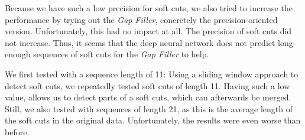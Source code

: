Because we have such a low precision for soft cuts, we also tried to increase the performance by trying out the \textit{Gap Filler}, concretely the precision-oriented version.
Unfortunately, this had no impact at all.
The precision of soft cuts did not increase.
Thus, it seems that the deep neural network does not predict long-enough sequences of soft cuts for the \textit{Gap Filler} to help.

We first tested with a sequence length of 11:
Using a sliding window approach to detect soft cuts, we repeatedly tested soft cuts of length 11.
Having such a low value, allows us to detect parts of a soft cuts, which can afterwards be merged.
Still, we also tested with sequences of length 21, as this is the average length of the soft cuts in the original data.
Unfortunately, the results were even worse than before.
